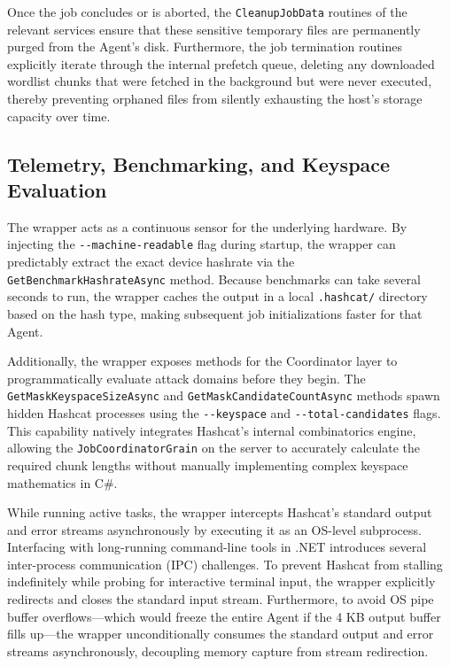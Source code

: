 Once the job concludes or is aborted, the \verb|CleanupJobData| routines of the relevant services ensure that these sensitive temporary files are permanently purged from the Agent's disk. Furthermore, the job termination routines explicitly iterate through the internal prefetch queue, deleting any downloaded wordlist chunks that were fetched in the background but were never executed, thereby preventing orphaned files from silently exhausting the host's storage capacity over time.

\subsection{Telemetry, Benchmarking, and Keyspace Evaluation}
\label{sec:telemetry_benchmarking}
The wrapper acts as a continuous sensor for the underlying hardware. By injecting the \verb|--machine-readable| flag during startup, the wrapper can predictably extract the exact device hashrate via the \verb|GetBenchmarkHashrateAsync| method. Because benchmarks can take several seconds to run, the wrapper caches the output in a local \verb|.hashcat/| directory based on the hash type, making subsequent job initializations faster for that Agent.

Additionally, the wrapper exposes methods for the Coordinator layer to programmatically evaluate attack domains before they begin. The \verb|GetMaskKeyspaceSizeAsync| and \verb|GetMaskCandidateCountAsync| methods spawn hidden Hashcat processes using the \verb|--keyspace| and \verb|--total-candidates| flags. This capability natively integrates Hashcat's internal combinatorics engine, allowing the \verb|JobCoordinatorGrain| on the server to accurately calculate the required chunk lengths without manually implementing complex keyspace mathematics in C\#.

While running active tasks, the wrapper intercepts Hashcat's standard output and error streams asynchronously by executing it as an OS-level subprocess. Interfacing with long-running command-line tools in .NET introduces several inter-process communication (IPC) challenges. To prevent Hashcat from stalling indefinitely while probing for interactive terminal input, the wrapper explicitly redirects and closes the standard input stream. Furthermore, to avoid OS pipe buffer overflows—which would freeze the entire Agent if the 4 KB output buffer fills up—the wrapper unconditionally consumes the standard output and error streams asynchronously, decoupling memory capture from stream redirection.

